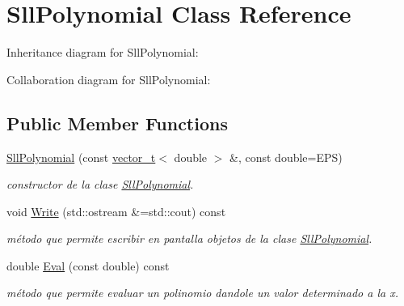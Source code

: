 \hypertarget{classSllPolynomial}{}\section{Sll\+Polynomial Class Reference}
\label{classSllPolynomial}


Inheritance diagram for Sll\+Polynomial\+:


Collaboration diagram for Sll\+Polynomial\+:
\subsection*{Public Member Functions}
\begin{DoxyCompactItemize}
\item 
\mbox{\label{classSllPolynomial_a5ffc663b19cd9912f7e74e71e0c48ebc}} 
\hyperlink{classSllPolynomial_a5ffc663b19cd9912f7e74e71e0c48ebc}{Sll\+Polynomial} (const \hyperlink{classvector__t}{vector\+\_\+t}$<$ double $>$ \&, const double=E\+PS)
\begin{DoxyCompactList}\small\item\em constructor de la clase \hyperlink{classSllPolynomial}{Sll\+Polynomial}. \end{DoxyCompactList}\item 
\mbox{\label{classSllPolynomial_af8e41da267b032b23a8e19233f5eaa52}} 
void \hyperlink{classSllPolynomial_af8e41da267b032b23a8e19233f5eaa52}{Write} (std\+::ostream \&=std\+::cout) const
\begin{DoxyCompactList}\small\item\em método que permite escribir en pantalla objetos de la clase \hyperlink{classSllPolynomial}{Sll\+Polynomial}. \end{DoxyCompactList}\item 
\mbox{\label{classSllPolynomial_aeeee1faae98570beb2ef82f1ad89b9dc}} 
double \hyperlink{classSllPolynomial_aeeee1faae98570beb2ef82f1ad89b9dc}{Eval} (const double) const
\begin{DoxyCompactList}\small\item\em método que permite evaluar un polinomio dandole un valor determinado a la x. \end{DoxyCompactList}\item 
\mbox{\label{classSllPolynomial_a173ebaed12d4851de81030ad04f6af4a}} 

\end{DoxyCompactItemize}
